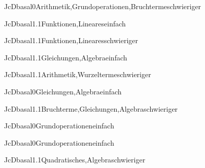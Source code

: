 \documentclass[12pt]{article}
\begin{document}
\begin{Add}{JcD}{basal0}{Arithmetik,Grundoperationen,Bruchterme}{schwieriger}
\end{Add}

\begin{Add}{JcD}{basal1.1}{Funktionen,Lineares}{einfach}
\end{Add}

\begin{Add}{JcD}{basal1.1}{Funktionen,Lineares}{schwieriger}
\end{Add}

\begin{Add}{JcD}{basal1.1}{Gleichungen,Algebra}{einfach}
\end{Add}

\begin{Add}{JcD}{basal1.1}{Arithmetik,Wurzelterme}{schwieriger}
\end{Add}

\begin{Add}{JcD}{basal0}{Gleichungen,Algebra}{einfach}
\end{Add}

\begin{Add}{JcD}{basal1.1}{Bruchterme,Gleichungen,Algebra}{schwieriger}
\end{Add}

\begin{Add}{JcD}{basal0}{Grundoperationen}{einfach}
\end{Add}

\begin{Add}{JcD}{basal0}{Grundoperationen}{einfach}
\end{Add}

\begin{Add}{JcD}{basal1.1}{Quadratisches,Algebra}{schwieriger}
\end{Add}
\end{document}
